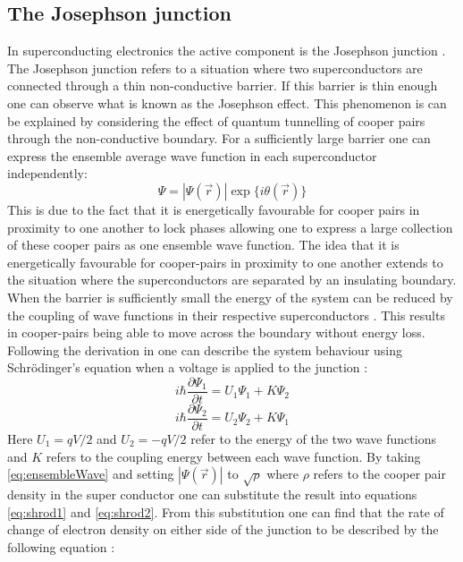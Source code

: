\subsection{The Josephson junction}
In superconducting electronics the active component is the Josephson junction \cite{Duzer_1999_Princip_Super}. The Josephson junction refers to a situation where two superconductors are connected through a thin non-conductive barrier. If this barrier is thin enough one can observe what is known as the Josephson effect. This phenomenon is can be explained by considering the effect of quantum tunnelling of cooper pairs through the non-conductive boundary. For a sufficiently large barrier one can express the ensemble average wave function in each superconductor independently\cite{Duzer_1999_Princip_Super}:
\begin{equation}
    \Psi = |\Psi(\Vec{r})| \exp{\{i\theta(\Vec{r})\}}
    \label{eq:ensembleWave}
\end{equation}
This is due to the fact that it is energetically favourable for cooper pairs in proximity to one another to lock phases \cite{Duzer_1999_Princip_Super} allowing one to express a large collection of these cooper pairs as one ensemble wave function. The idea that it is energetically favourable for cooper-pairs in proximity to one another extends to the situation where the superconductors are separated by an insulating boundary. When the barrier is sufficiently small the energy of the system can be reduced by the coupling of wave functions in their respective superconductors \cite{Duzer_1999_Princip_Super}. This results in cooper-pairs being able to move across the boundary without energy loss. Following the derivation in \cite{Feynman_Leighton_Sands_2013} one can describe the system behaviour using Schrödinger's equation when a voltage is applied to the junction \cite{Feynman_Leighton_Sands_2013}: 
\begin{equation}
    i\hbar \frac{\partial\Psi_1}{\partial t} = U_1\Psi_1 +K\Psi_2 
    \label{eq:shrod1}
\end{equation}
\begin{equation}
    i\hbar \frac{\partial\Psi_2}{\partial t} = U_2\Psi_2 +K\Psi_1
    \label{eq:shrod2}
\end{equation}
Here $U_1 = qV/2$ and $U_2 = -qV/2$ \cite{Feynman_Leighton_Sands_2013} refer to the energy of the two wave functions and $K$ refers to the coupling energy between each wave function. By taking \ref{eq:ensembleWave} and setting $|\Psi(\Vec{r})|$ to $\sqrt{\rho}$ where $\rho$ refers to the cooper pair density in the super conductor one can substitute the result into equations \ref{eq:shrod1} and \ref{eq:shrod2}. From this substitution one can find that the rate of change of electron density on either side of the junction to be described by the following equation \cite{Feynman_Leighton_Sands_2013}:

